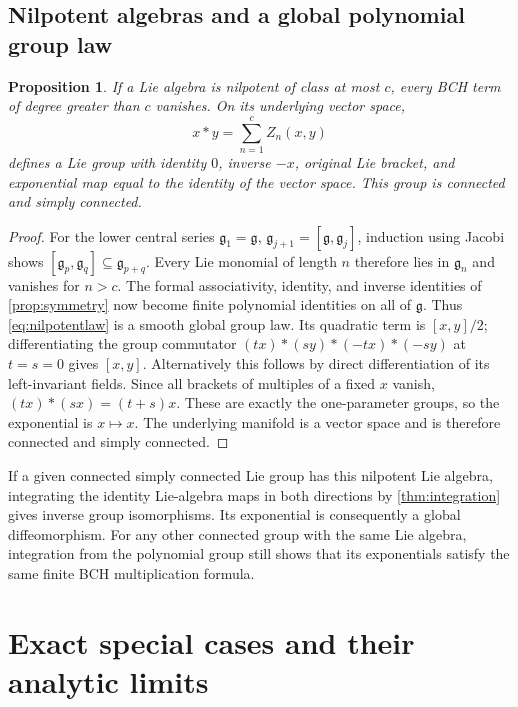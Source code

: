 \documentclass[11pt]{article}
\numberwithin{equation}{section}
\newtheorem{proposition}[proposition]{Proposition}
\theoremstyle{definition}
\theoremstyle{remark}
\newcommand{\g}{\mathfrak{g}}
\begin{document}
\subsection{Nilpotent algebras and a global polynomial group law}
\begin{proposition}\label{prop:nilpotent}
If a Lie algebra is nilpotent of class at most $c$, every BCH term
of degree greater than $c$ vanishes. On its underlying vector space,
\begin{equation}\label{eq:nilpotentlaw}
 x*y=\sum_{n=1}^{c}Z_n(x,y)
\end{equation}
defines a Lie group with identity $0$, inverse $-x$, original Lie
bracket, and exponential map equal to the identity of the vector
space. This group is connected and simply connected.
\end{proposition}
\begin{proof}
For the lower central series $\g_1=\g$,
$\g_{j+1}=[\g,\g_j]$, induction using Jacobi shows
$[\g_p,\g_q]\subseteq\g_{p+q}$. Every Lie monomial of length $n$
therefore lies in $\g_n$ and vanishes for $n>c$.
The formal associativity, identity, and inverse identities of
\cref{prop:symmetry} now become finite polynomial identities on all
of $\g$. Thus \eqref{eq:nilpotentlaw} is a smooth global group law.
Its quadratic term is $[x,y]/2$; differentiating the group
commutator $(tx)*(sy)*(-tx)*(-sy)$ at $t=s=0$ gives $[x,y]$.
Alternatively this follows by direct differentiation of its
left-invariant fields. Since all brackets of multiples of a fixed
$x$ vanish, $(tx)*(sx)=(t+s)x$. These are exactly the one-parameter
groups, so the exponential is $x\mapsto x$. The underlying manifold
is a vector space and is therefore connected and simply connected.
\end{proof}
If a given connected simply connected Lie group has this nilpotent
Lie algebra, integrating the identity Lie-algebra maps in both
directions by \cref{thm:integration} gives inverse group
isomorphisms. Its exponential is consequently a global
diffeomorphism. For any other connected group with the same Lie
algebra, integration from the polynomial group still shows that its
exponentials satisfy the same finite BCH multiplication formula.

\section{Exact special cases and their analytic limits}
\label{sec:special}
\end{document}
